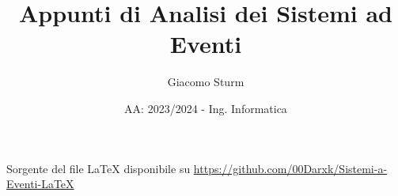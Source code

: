\documentclass{article}
\title{Appunti di Analisi dei Sistemi ad Eventi}
\author{Giacomo Sturm}
\date{AA: 2023/2024 - Ing. Informatica}
\numberwithin{equation}{subsection}
\begin{document}
\maketitle

\vspace{10mm}

\begin{center}
    Sorgente del file LaTeX disponibile su \url{https://github.com/00Darxk/Sistemi-a-Eventi-LaTeX}
\end{center}

\clearpage

\tableofcontents

\clearpage
\end{document}
